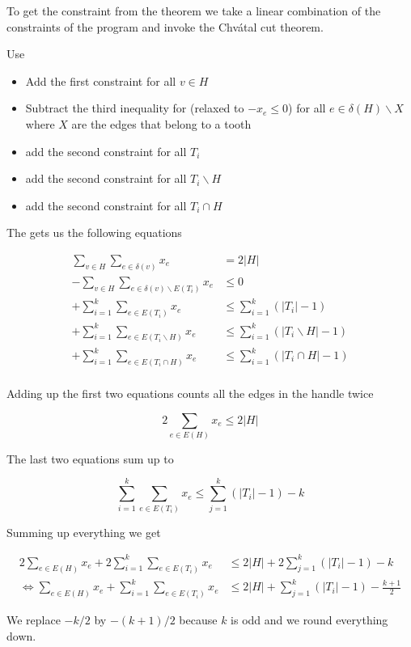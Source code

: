 \begin{pr} To get the constraint from the theorem we take a linear combination of the constraints of the program and invoke the Chv\'{a}tal cut theorem.

Use

\begin{itemize}
\item Add the first constraint for all $v\in H$
\item Subtract the third inequality for (relaxed to $-x_e\leq 0$) for all $e\in \delta(H)\backslash X$ where $X$ are the edges that belong to a tooth
\item add the second constraint for all $T_i$
\item add the second constraint for all $T_i\backslash H$
\item add the second constraint for all $T_i \cap H$
\end{itemize}

The gets us the following equations

\begin{align*}
\sum_{v\in H}\sum_{e\in \delta(v)} x_e&=2|H|\\
-\sum_{v\in H} \sum_{e\in \delta(v) \backslash E(T_i)} x_e & \leq 0\\
+\sum_{i=1}^k \sum_{e\in E(T_i)} x_e &\leq \sum_{i=1}^k(|T_i|-1)\\
+\sum_{i=1}^k \sum_{e\in E(T_i\backslash H)} x_e &\leq \sum_{i=1}^k(|T_i\backslash H|-1)\\
+\sum_{i=1}^k \sum_{e\in E(T_i\cap H)} x_e &\leq \sum_{i=1}^k(|T_i\cap H|-1)\\
\end{align*}

Adding up the first two equations counts all the edges in the handle twice

\[2\sum_{e\in E(H)} x_e \leq 2|H|\]

The last two equations sum up to

\[\sum_{i=1}^k \sum_{e\in E(T_i)} x_e \leq \sum_{j=1}^k (|T_i|-1) -k\]

Summing up everything we get

\begin{align*}
2\sum_{e\in E(H)} x_e + 2\sum_{i=1}^k \sum_{e\in E(T_i)} x_e &\leq 2|H| + 2\sum_{j=1}^k (|T_i|-1) -k\\
\Leftrightarrow \sum_{e\in E(H)} x_e + \sum_{i=1}^k \sum_{e\in E(T_i)} x_e &\leq 2|H| + \sum_{j=1}^k (|T_i|-1) -\frac{k+1}{2}
\end{align*}

We replace $-k/2$ by $-(k+1)/2$ because $k$ is odd and we round everything down.
\end{pr}


